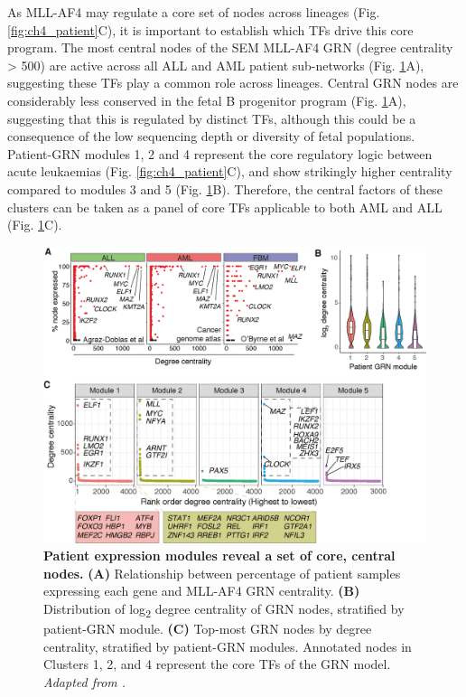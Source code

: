 As MLL-AF4 may regulate a core set of nodes across lineages (Fig. \ref{fig:ch4_patient}C), it is important to establish which TFs drive this core program. The most central nodes of the SEM MLL-AF4 GRN (degree centrality > 500) are active across all ALL and AML patient sub-networks (Fig. \ref{fig:ch4_core}A), suggesting these TFs play a common role across lineages. Central GRN nodes are considerably less conserved in the fetal B progenitor program (Fig. \ref{fig:ch4_core}A), suggesting that this is regulated by distinct TFs, although this could be a consequence of the low sequencing depth or diversity of fetal populations. Patient-GRN modules 1, 2 and 4 represent the core regulatory logic between acute leukaemias (Fig. \ref{fig:ch4_patient}C), and show strikingly higher centrality compared to modules 3 and 5 (Fig. \ref{fig:ch4_core}B). Therefore, the central factors of these clusters can be taken as a panel of core TFs applicable to both AML and ALL (Fig. \ref{fig:ch4_core}C).

\begin{figure}[!t]
    \centering
    \includegraphics[width=\textwidth,height=\textheight,keepaspectratio]{figures/chapter4/ch4_core-nodes.png}
    \caption[{Patient expression modules reveal a set of core, central nodes.}]
    {\textbf{Patient expression modules reveal a set of core, central nodes.} 
    \textbf{(A)} Relationship between percentage of patient samples expressing each gene and MLL-AF4 GRN centrality. 
    \textbf{(B)} Distribution of log\textsubscript{2} degree centrality of GRN nodes, stratified by patient-GRN module.  
    \textbf{(C)} Top-most GRN nodes by degree centrality, stratified by patient-GRN modules. Annotated nodes in Clusters 1, 2, and 4 represent the core TFs of the GRN model. 
    \textit{Adapted from \cite{harman_kmt2a-aff1_2021}.}
    }
    \label{fig:ch4_core}
\end{figure}

